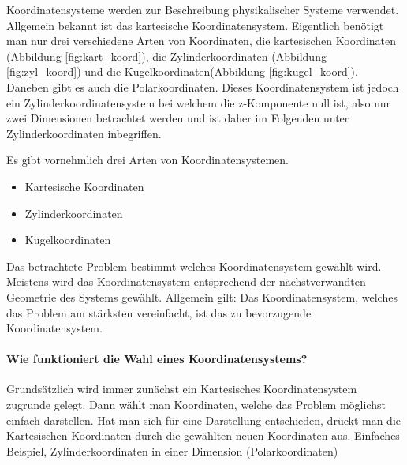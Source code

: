 Koordinatensysteme werden zur Beschreibung physikalischer Systeme verwendet. Allgemein bekannt ist das kartesische Koordinatensystem.
Eigentlich benötigt man nur drei verschiedene Arten von Koordinaten, die kartesischen Koordinaten (Abbildung \ref{fig:kart_koord}),  die Zylinderkoordinaten (Abbildung \ref{fig:zyl_koord}) und die Kugelkoordinaten(Abbildung \ref{fig:kugel_koord}). 
Daneben gibt es auch die Polarkoordinaten. Dieses Koordinatensystem ist jedoch ein Zylinderkoordinatensystem bei welchem die z-Komponente null ist, also nur zwei Dimensionen betrachtet werden und ist daher im Folgenden unter Zylinderkoordinaten inbegriffen. 
\newpage
\begin{importantbox}
Es gibt vornehmlich drei Arten von Koordinatensystemen. 
\begin{itemize}
	\item Kartesische Koordinaten
	\item Zylinderkoordinaten
	\item Kugelkoordinaten
\end{itemize}
Das betrachtete Problem bestimmt welches Koordinatensystem gewählt wird. Meistens wird das Koordinatensystem entsprechend der nächstverwandten Geometrie des Systems gewählt. Allgemein gilt: Das Koordinatensystem, welches das Problem am stärksten vereinfacht, ist das zu bevorzugende Koordinatensystem.

\paragraph{Wie funktioniert die Wahl eines Koordinatensystems?}
Grundsätzlich wird immer zunächst ein Kartesisches Koordinatensystem zugrunde gelegt. Dann wählt man Koordinaten, welche das Problem möglichst einfach darstellen. Hat man sich für eine Darstellung entschieden, drückt man die Kartesischen Koordinaten durch die gewählten neuen Koordinaten aus.
Einfaches Beispiel, Zylinderkoordinaten in einer Dimension (Polarkoordinaten)\newline
\begin{multicols}{2} %
\end{multicols}
\end{importantbox}
